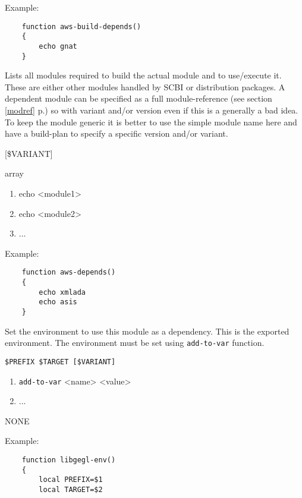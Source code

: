 \documentclass[a4paper,12pt,twoside]{article}
\newcommand{\code}[1]{\texttt{#1}}
\newcommand{\seeref}[1]{see section \ref{#1} p.\pageref{#1}}
\begin{document}
\begin{description}[font=\large\texttt]
	Example:
	\begin{lstlisting}
	function aws-build-depends()
	{
		echo gnat
	}
	\end{lstlisting}

	\item[<module>-depends] Lists all modules required to build the actual module and to use/execute it. These are either other modules handled by SCBI or distribution packages. A dependent module can be specified as a full module-reference (\seeref{modref}) so with variant and/or version even if this is a generally a bad idea. To keep the module generic it is better to use the simple module name here and have a build-plan to specify a specific version and/or variant.

	\begin{description}[font=\textit,style=standard]
		\item[parameter] \tabto{2cm} [\$VARIANT]
		\item[return] \tabto{2cm} array
		\begin{enumerate}
			\item echo <module1>
			\item echo <module2>
			\item ...
		\end{enumerate}
	\end{description}

	Example:
	\begin{lstlisting}
	function aws-depends()
	{
		echo xmlada
		echo asis
	}
	\end{lstlisting}

	\item[<module>-env] Set the environment to use this module as a dependency. This is the exported environment. The environment must be set using \code{add-to-var} function.
	\begin{description}[font=\textit,style=standard]
		\item[parameter] \tabto{2cm} \code{\$PREFIX \$TARGET [\$VARIANT]}
		\begin{enumerate}
			\item \code{add-to-var} <name> <value>
			\item ...
		\end{enumerate}
		\item[return] \tabto{2cm} NONE
	\end{description}

	Example:
	\begin{lstlisting}
	function libgegl-env()
	{
		local PREFIX=$1
		local TARGET=$2


\end{lstlisting}
\end{description}
\end{document}
